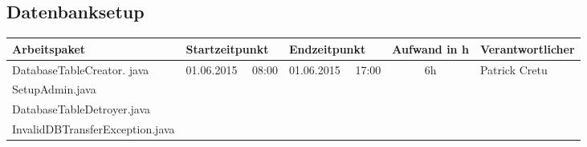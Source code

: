 \begin{landscape}
\subsection{Datenbanksetup}
\begin{tabular}{|p{10.3cm}|p{3.2cm}|p{3.2cm}|c|p{3.5cm}|}
	\hline  \textbf{Arbeitspaket} & \textbf{Startzeitpunkt} & \textbf{Endzeitpunkt} & \textbf{Aufwand in h} & \textbf{Verantwortlicher} \\ 
       \hline DatabaseTableCreator. java                 & 01.06.2015 \ \ 08:00       & 01.06.2015  \ \  17:00      &  6h                & Patrick Cretu\\
       SetupAdmin.java                            &                            &                            &                                                  &\\
       DatabaseTableDetroyer.java                 &                            &                            &                                                  &\\
       InvalidDBTransferException.java            &                            &                            &                                                  &\\
	\hline 
\end{tabular} \ \\
\ \\



\end{landscape}
